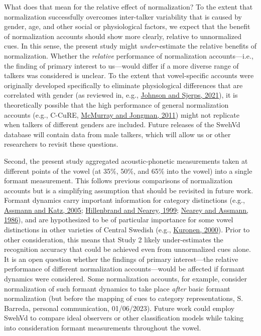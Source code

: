 \documentclass[utf8]{frontiersSCNS}
\begin{document}
What does that mean for the relative effect of normalization? To the extent that normalization successfully overcomes inter-talker variability that is caused by gender, age, and other social or physiological factors, we expect that the benefit of normalization accounts should show more clearly, relative to unnormalized cues. In this sense, the present study might \emph{under}-estimate the relative benefits of normalization. Whether the \emph{relative} performance of normalization accounts---i.e., the finding of primary interest to us---would differ if a more diverse range of talkers was considered is unclear. To the extent that vowel-specific accounts were originally developed specifically to eliminate physiological differences that are correlated with gender (as reviewed in, e.g., \protect\hyperlink{ref-johnson-sjerps2021}{Johnson and Sjerps, 2021}), it is theoretically possible that the high performance of general normalization accounts (e.g., C-CuRE, \protect\hyperlink{ref-mcmurray-jongman2011}{McMurray and Jongman, 2011}) might not replicate when talkers of different genders are included. Future releases of the SwehVd database will contain data from male talkers, which will allow us or other researchers to revisit these questions.

Second, the present study aggregated acoustic-phonetic measurements taken at different points of the vowel (at 35\%, 50\%, and 65\% into the vowel) into a single formant measurement. This follows previous comparisons of normalization accounts but is a simplifying assumption that should be revisited in future work. Formant dynamics carry important information for category distinctions (e.g., \protect\hyperlink{ref-Assmann2005}{Assmann and Katz, 2005}; \protect\hyperlink{ref-hillenbrand1999}{Hillenbrand and Nearey, 1999}; \protect\hyperlink{ref-nearey1986}{Nearey and Assmann, 1986}), and are hypothesized to be of particular importance for some vowel distinctions in other varieties of Central Swedish (e.g., \protect\hyperlink{ref-kuronen2000}{Kuronen, 2000}). Prior to other consideration, this means that Study 2 likely under-estimates the recognition accuracy that could be achieved even from unnormalized cues alone. It is an open question whether the findings of primary interest---the relative performance of different normalization accounts---would be affected if formant dynamics were considered. Some normalization accounts, for example, consider normalization of such formant dynamics to take place \emph{after} basic formant normalization (but before the mapping of cues to category representations, S. Barreda, personal communication, 01/06/2023). Future work could employ SwehVd to compare ideal observers or other classification models while taking into consideration formant measurements throughout the vowel.
\end{document}
